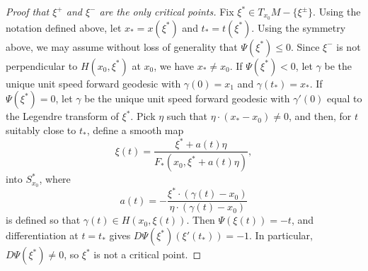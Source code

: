 \begin{proof}[Proof that $\xi^+$ and $\xi^-$ are the only critical points]
    Fix $\xi^* \in T_{x_0} M - \{ \xi^{\pm} \}$. Using the notation defined above, let $x_* = x(\xi^*)$ and $t_* = t(\xi^*)$. Using the symmetry above, we may assume without loss of generality that $\Psi(\xi^*) \leq 0$. Since $\xi^-$ is not perpendicular to $H(x_0,\xi^*)$ at $x_0$, we have $x_* \neq x_0$. If $\Psi(\xi^*) < 0$, let $\gamma$ be the unique unit speed forward geodesic with $\gamma(0) = x_1$ and $\gamma(t_*) = x_*$. If $\Psi(\xi^*) = 0$, let $\gamma$ be the unique unit speed forward geodesic with $\gamma'(0)$ equal to the Legendre transform of $\xi^*$. Pick $\eta$ such that $\eta \cdot (x_* - x_0) \neq 0$, and then, for $t$ suitably close to $t_*$, define a smooth map
    \begin{equation} \xi(t) = \frac{\xi^* + a(t) \eta}{F_*(x_0, \xi^* + a(t) \eta)}, \end{equation}
    into $S_{x_0}^*$, where
    \begin{equation} a(t) = - \frac{\xi^* \cdot ( \gamma(t) - x_0 )}{\eta \cdot ( \gamma(t) - x_0 )} \end{equation}
    is defined so that $\gamma(t) \in H(x_0, \xi(t))$. Then $\Psi( \xi(t) ) = -t$, and differentiation at $t = t_*$ gives $D\Psi( \xi^* ) ( \xi'(t_*) ) = -1$. In particular, $D \Psi( \xi^* ) \neq 0$, so $\xi^*$ is not a critical point. \qedhere




    \end{proof}

